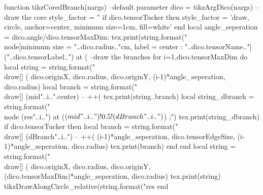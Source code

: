 \begin{luacode*}
	function tikzCoredBranch(nargs)
	 	--default parameter
	 	dico = tikzArgDico(nargs)
		--draw the core
	 	style_factor = ''
	 	if dico.tensorTucker then
	 	  style_factor = 'draw, circle, anchor=center, minimum size=1cm, fill=white'
	 	end
	 	local angle_seperation = dico.angle/dico.tensorMaxDim;
	 	tex.print(string.format("\\node[minimum size = "..dico.radius.."cm, label = center : "..dico.tensorName.."] ("..dico.tensorLabel..") at (%
	 	--draw the branches
	 	for i=1,dico.tensorMaxDim do
	 		local string = string.format("\\draw[] (%
	 		dico.originX, dico.radius, dico.originY, (i-1)*angle_seperation, dico.radius)
	 		local branch = string.format("\\draw[] (mid"..i..".center) -- ++(%
	 		tex.print(string..branch)
	 		local string_dbranch = string.format("\\node (res"..i..") at ($(mid"..i..")!0.5!(dBranch"..i..")$) {};")
			tex.print(string_dbranch)
			if dico.tensorTucker then
			  local branch = string.format("\\draw[] (dBranch"..i..") -- ++(%
			  (i-1)*angle_seperation, dico.tensorEdgeSize, (i-1)*angle_seperation, dico.radius)
			  tex.print(branch)
			end
	 	end
		local string = string.format("\\draw[] (%
		dico.originX, dico.radius, dico.originY, (dico.tensorMaxDim)*angle_seperation, dico.radius)
		tex.print(string)
		tikzDrawAlongCircle_relative(string.format("res%
	end
  

\end{luacode*}
